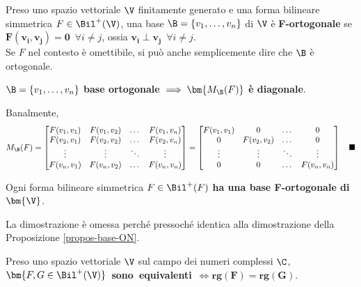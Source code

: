 \documentclass[11pt, a4paper, titlepage, oneside]{scrbook}
\begin{document}
\begin{Definizione}
\label{def-base-F-ortogonale}
Preso uno spazio vettoriale $\V$ finitamente generato e una forma bilineare simmetrica $F \in \Bil^+(\V)$, una base $\B = \{v_1, \ldots, v_n\}$ di $\V$ è \textbf{F-ortogonale} se $\bm{F(v_i, v_j) = 0} \enspace \forall i \neq j$, ossia $\bm{v_i \perp v_j} \enspace \forall i \neq j$. \\
\NB Se $F$ nel contesto è omettibile, si può anche semplicemente dire che $\B$ è ortogonale.
\end{Definizione}

\begin{Osservazione}[]
\label{oss-MB-diagonale}
$\B = \{v_1, \ldots, v_n\}$ \textbf{base ortogonale} $\implies \bm{M_\B(F)}$ \textbf{è diagonale}.
\end{Osservazione}

\Dimostrazione \nopagebreak

Banalmente,
\[
M_\B(F) = \begin{bmatrix}
    F(v_1,v_1) & F(v_1,v_2) & \dots & F(v_1,v_n) \\
    F(v_2,v_1) & F(v_2,v_2) & \dots & F(v_2,v_n) \\
    \vdots & \vdots & \ddots & \vdots \\
    F(v_n,v_1) & F(v_n,v_2) & \dots & F(v_n,v_n)
\end{bmatrix} = \begin{bmatrix}
    F(v_1,v_1) & 0 & \dots & 0 \\
    0 & F(v_2, v_2) & \dots & 0 \\
    \vdots & \vdots & \ddots & \vdots \\
    0 & 0  & \dots & F(v_n, v_n)
\end{bmatrix}
\quad \blacksquare
\]

\begin{Proposizione}[]
\label{propos-base-ortogonale}
Ogni forma bilineare simmetrica $F \in \Bil^+(F)$ \textbf{ha una base F-ortogonale di} $\bm{\V}$. 
\end{Proposizione}

\Dimostrazione \nopagebreak

La dimostrazione è omessa perché pressoché identica alla dimostrazione della Proposizione \ref{propos-base-ON}.

\begin{Proposizione}[]
\label{propos-spazio-vettoriale-C-forme-bilineari-simmetriche-rango}
Preso uno spazio vettoriale $\V$ sul campo dei numeri complessi $\C$, \mbox{$\bm{F,G \in \Bil^+(\V)}$ \textbf{sono equivalenti} $\iff \bm{rg(F) = rg(G)}$}.
\end{Proposizione}
\end{document}
